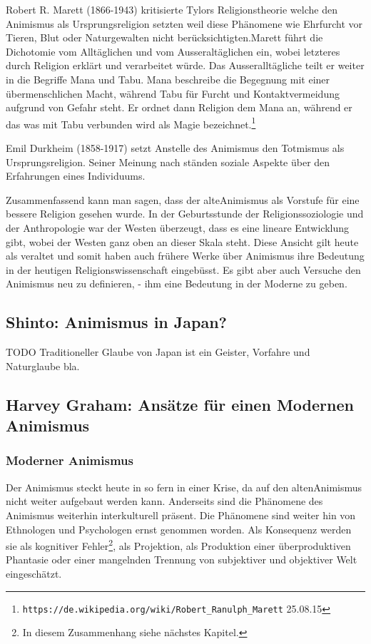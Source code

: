 Robert R. Marett (1866-1943) kritisierte Tylors Religionstheorie welche den Animismus als Ursprungsreligion setzten weil diese Phänomene wie Ehrfurcht vor Tieren, Blut oder Naturgewalten nicht berücksichtigten.Marett führt die Dichotomie vom Alltäglichen und vom Ausseraltäglichen ein, wobei letzteres durch Religion erklärt und verarbeitet würde. Das Ausseralltägliche teilt er weiter in die Begriffe Mana und Tabu. Mana beschreibe die Begegnung mit einer übermenschlichen Macht, während Tabu für Furcht und Kontaktvermeidung aufgrund von Gefahr steht. Er ordnet dann Religion dem Mana an, während er das was mit Tabu verbunden wird als Magie bezeichnet.\footnote{\texttt{https://de.wikipedia.org/wiki/Robert\_Ranulph\_Marett} 25.08.15} 

Emil Durkheim (1858-1917) setzt Anstelle des Animismus den Totmismus als Ursprungsreligion. Seiner Meinung nach ständen soziale Aspekte über den Erfahrungen eines Individuums.

Zusammenfassend kann man sagen, dass der \glqq alte\grqq Animismus als Vorstufe für eine bessere Religion gesehen wurde. In der Geburtsstunde der Religionssoziologie und der Anthropologie war der Westen überzeugt, dass es eine lineare Entwicklung gibt, wobei der Westen ganz oben an dieser Skala steht. Diese Ansicht gilt heute als veraltet und somit haben auch frühere Werke über Animismus ihre Bedeutung in der heutigen Religionswissenschaft eingebüsst. Es gibt aber auch Versuche den Animismus neu zu definieren, - ihm eine Bedeutung in der Moderne zu geben. 

\subsection{Shinto: Animismus in Japan?}
TODO
Traditioneller Glaube von Japan ist ein Geister, Vorfahre und Naturglaube bla.

\subsection{Harvey Graham: Ansätze für einen Modernen Animismus}
\subsubsection*{Moderner Animismus}
Der Animismus steckt heute in so fern in einer Krise, da auf den \glqq alten\grqq Animismus nicht weiter aufgebaut werden kann. Anderseits sind die Phänomene des Animismus weiterhin interkulturell präsent. Die Phänomene sind weiter hin von Ethnologen und Psychologen ernst genommen worden. Als Konsequenz werden sie als kognitiver Fehler\footnote{In diesem Zusammenhang siehe nächstes Kapitel.}, als Projektion, als Produktion einer überproduktiven Phantasie oder einer mangelnden Trennung von subjektiver und objektiver Welt eingeschätzt. 

